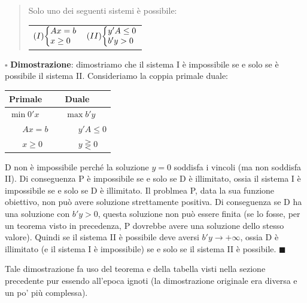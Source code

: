 \documentclass[11pt]{book}
\makeatletter
\newenvironment{sistema}%
{\left\lbrace\begin{array}{@{}l@{}}}%
{\end{array}\right.}
\makeatother
\begin{document}
\begin{quote}
Solo uno dei seguenti sistemi \`e possibile:

\begin{center}
\begin{tabular}{ll}
$(I)\begin{sistema}
Ax=b\\
x \geq 0
\end{sistema}$ &
$(II)\begin{sistema}
y'A \leq 0 \\
b'y > 0
\end{sistema}$
\end{tabular}
\end{center}
\end{quote}

\vspace{11pt} $\square$ {\bf Dimostrazione}: dimostriamo che il
sistema I \`e impossibile se e solo se \`e possibile il sistema
II. Consideriamo la coppia primale duale:

\begin{center}
\begin{tabular}{lp{3cm}l}
{\bf Primale} && {\bf Duale} \\\hline
$\min 0'x$ && $\max b'y$\\
$\phantom{aaa}Ax = b$ && $\phantom{aaa}y'A\leq 0$\\
$\phantom{aaa}x \geq 0$ && $\phantom{aaa}y \gtreqless 0$\\
\end{tabular}
\end{center}

D non \`e impossibile perch\'e la soluzione $y=0$ soddisfa i vincoli
(ma non soddisfa II). Di conseguenza P \`e impossibile se e solo se D
\`e illimitato, ossia il sistema I \`e impossibile se e solo se D \`e
illimitato. Il problmea P, data la sua funzione obiettivo, non pu\`o
avere soluzione strettamente positiva. Di conseguenza se D ha una
soluzione con $b'y > 0$, questa soluzione non pu\`o essere finita (se
lo fosse, per un teorema visto in precedenza, P dovrebbe avere una
soluzione dello stesso valore). Quindi se il sistema II \`e possibile
deve aversi $b'y \rightarrow +\infty$, ossia D \`e illimitato (e il
sistema I \`e impossibile) se e solo se il sistema II \`e
possibile. $\blacksquare$
\vspace{11pt}

Tale dimostrazione fa uso del teorema e della tabella visti nella
sezione precedente pur essendo all'epoca ignoti (la dimostrazione
originale era diversa e un po' pi\`u complessa).
\end{document}
